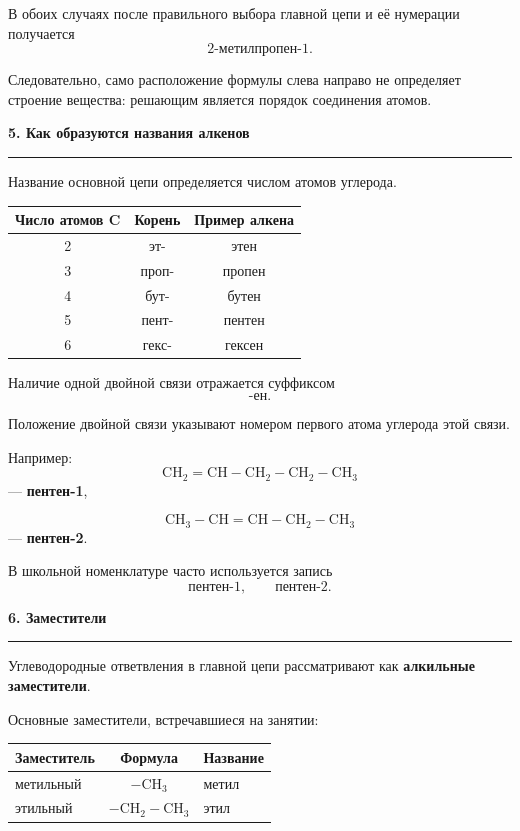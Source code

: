 \documentclass[a4paper,12pt]{article}
\newcommand{\lessonsection}[1]{%
    \vspace{0.7em}
    {\Large\bfseries\color{darkaccent}#1}\par
    \vspace{0.15em}
    {\color{linegray}\rule{\linewidth}{0.7pt}}
    \vspace{0.35em}
}
\newcommand{\important}[1]{\textbf{\color{darkaccent}#1}}
\begin{document}
В обоих случаях после правильного выбора главной цепи и её нумерации получается
\[
\boxed{\text{2-метилпропен-1}.}
\]

Следовательно, само расположение формулы слева направо не определяет строение вещества: решающим является порядок соединения атомов.


\lessonsection{5. Как образуются названия алкенов}

Название основной цепи определяется числом атомов углерода.

\begin{center}
\renewcommand{\arraystretch}{1.3}
\begin{tabular}{ccc}
\toprule
Число атомов C & Корень & Пример алкена \\
\midrule
2 & эт-   & этен \\
3 & проп- & пропен \\
4 & бут-  & бутен \\
5 & пент- & пентен \\
6 & гекс- & гексен \\
\bottomrule
\end{tabular}
\end{center}

Наличие одной двойной связи отражается суффиксом
\[
\boxed{\text{-ен}.}
\]

Положение двойной связи указывают номером первого атома углерода этой связи.

Например:
\[
\mathrm{CH_2=CH-CH_2-CH_2-CH_3}
\]
--- \important{пентен-1},

\[
\mathrm{CH_3-CH=CH-CH_2-CH_3}
\]
--- \important{пентен-2}.

В школьной номенклатуре часто используется запись
\[
\text{пентен-1},\qquad \text{пентен-2}.
\]


\lessonsection{6. Заместители}

Углеводородные ответвления в главной цепи рассматривают как
\important{алкильные заместители}.

Основные заместители, встречавшиеся на занятии:

\begin{center}
\renewcommand{\arraystretch}{1.35}
\begin{tabularx}{0.82\linewidth}{l c X}
\toprule
Заместитель & Формула & Название \\
\midrule
метильный & \(\mathrm{-CH_3}\) & метил \\
этильный & \(\mathrm{-CH_2-CH_3}\) & этил \\
\bottomrule
\end{tabularx}
\end{center}
\end{document}
